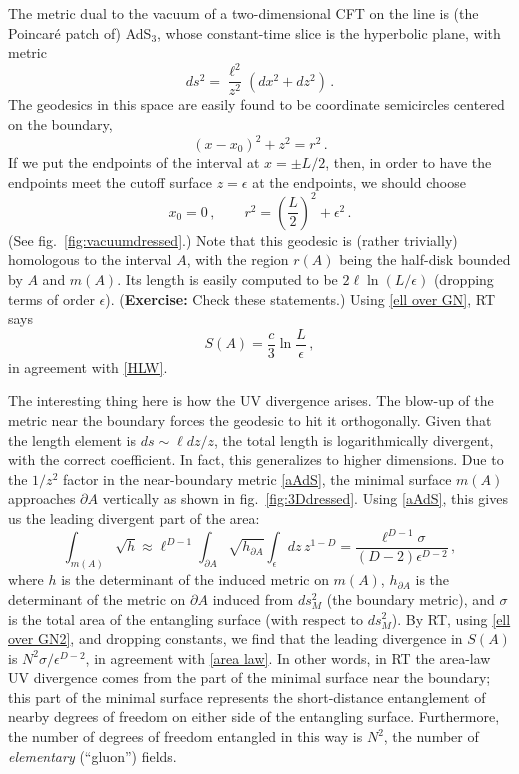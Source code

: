 \documentclass[11pt]{article}
\begin{document}
The metric dual to the vacuum of a two-dimensional CFT on the line is (the Poincar\'e patch of) AdS$_3$, whose constant-time slice is the hyperbolic plane, with metric
\begin{equation}\label{hyperbolic}
ds^2 = \frac{\ell^2}{z^2}(dx^2+dz^2)\,.
\end{equation}
The geodesics in this space are easily found to be coordinate semicircles centered on the boundary,
\begin{equation}\label{semicircle}
(x-x_0)^2+z^2 = r^2\,.
\end{equation}
If we put the endpoints of the interval at $x=\pm L/2$, then, in order to have the endpoints meet the cutoff surface $z=\epsilon$ at the endpoints, we should choose
\begin{equation}
x_0 = 0\,,\qquad r^2 = \left(\frac L2\right)^2+\epsilon^2\,.
\end{equation}
(See fig.\ \ref{fig:vacuumdressed}.) Note that this geodesic is (rather trivially) homologous to the interval $A$, with the region $r(A)$ being the half-disk bounded by $A$ and $m(A)$. Its length is easily computed to be $2\ell\ln(L/\epsilon)$ (dropping terms of order $\epsilon$). ({\bf Exercise:} Check these statements.) Using \eqref{ell over GN}, RT says
\begin{equation}
S(A) = \frac c3\ln\frac L\epsilon\,,
\end{equation}
in agreement with \eqref{HLW}.

The interesting thing here is how the UV divergence arises. The blow-up of the metric near the boundary forces the geodesic to hit it orthogonally. Given that the length element is $ds\sim \ell dz/z$, the total length is logarithmically divergent, with the correct coefficient. In fact, this generalizes to higher dimensions. Due to the $1/z^2$ factor in the near-boundary metric \eqref{aAdS}, the minimal surface $m(A)$ approaches $\partial A$ vertically as shown in fig.\ \ref{fig:3Ddressed}. Using \eqref{aAdS}, this gives us the leading divergent part of the area:
\begin{equation}
\int_{m(A)}\sqrt h \approx \ell^{D-1}\int_{\partial A}\sqrt{h_{\partial A}}\int_\epsilon dz\, z^{1-D} = \frac{\ell^{D-1}\sigma}{(D-2)\epsilon^{D-2}}\,,
\end{equation}
where $h$ is the determinant of the induced metric on $m(A)$, $h_{\partial A}$ is the determinant of the metric on $\partial A$ induced from $ds^2_M$ (the boundary metric), and $\sigma$ is the total area of the entangling surface (with respect to $ds^2_M$). By RT, using \eqref{ell over GN2}, and dropping constants, we find that the leading divergence in $S(A)$ is $N^2\sigma/\epsilon^{D-2}$, in agreement with \eqref{area law}. In other words, in RT the area-law UV divergence comes from the part of the minimal surface near the boundary; this part of the minimal surface represents the short-distance entanglement of nearby degrees of freedom on either side of the entangling surface. Furthermore, the number of degrees of freedom entangled in this way is $N^2$, the number of \emph{elementary} (``gluon'') fields.
\end{document}

